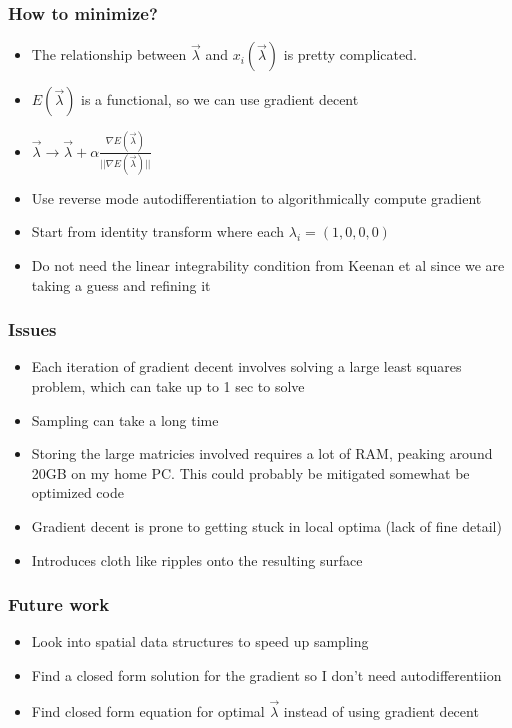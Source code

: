 \documentclass{beamer}
\begin{document}
\begin{frame}
\frametitle{How to minimize?}
\begin{itemize}
\item The relationship between $\vec{\lambda}$ and $x_{i}(\vec{\lambda})$ is pretty complicated. 
\item $E(\vec{\lambda})$ is a functional, so we can use gradient decent
\item $\vec{\lambda} \rightarrow \vec{\lambda} + \alpha\frac{\nabla E(\vec{\lambda})}{||\nabla E(\vec{\lambda})||}$
\item Use reverse mode autodifferentiation to algorithmically compute gradient
\item Start from identity transform where each $\lambda_{i} = (1,0,0,0)$
\item Do not need the linear integrability condition from Keenan et al since we are taking a guess and refining it
\end{itemize}
\end{frame}

\begin{frame}
\frametitle{Issues}
\begin{itemize}
\item Each iteration of gradient decent involves solving a large least squares problem, which can take up to 1 sec to solve
\item Sampling can take a long time
\item Storing the large matricies involved requires a lot of RAM, peaking around 20GB on my home PC. This could probably be mitigated somewhat be optimized code
\item Gradient decent is prone to getting stuck in local optima (lack of fine detail)
\item Introduces cloth like ripples onto the resulting surface
\end{itemize}
\end{frame}

\begin{frame}
\frametitle{Future work}
\begin{itemize}
\item Look into spatial data structures to speed up sampling
\item Find a closed form solution for the gradient so I don't need autodifferentiion
\item Find closed form equation for optimal $\vec{\lambda}$ instead of using gradient decent
\end{itemize}
\end{frame}
\end{document}
